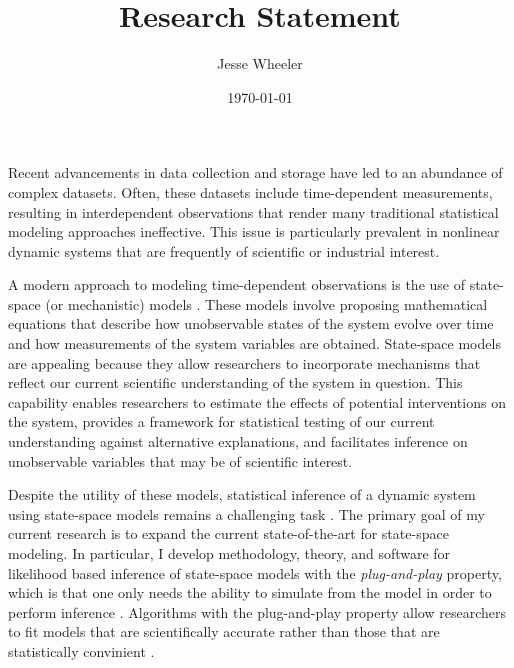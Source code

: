 \documentclass{article}
\title{Research Statement}
\author{Jesse Wheeler}
\date{\today}
\begin{document}
\rule{0mm}{1mm}
\vspace{-20mm}


\vspace{1mm}

\rule{0mm}{1mm}

\vspace{3mm}
\rule{0mm}{1mm}

\vspace{4mm}

\noindent Recent advancements in data collection and storage have led to an abundance of complex datasets.
Often, these datasets include time-dependent measurements, resulting in interdependent observations that render many traditional statistical modeling approaches ineffective.
This issue is particularly prevalent in nonlinear dynamic systems that are frequently of scientific or industrial interest.

A modern approach to modeling time-dependent observations is the use of state-space (or mechanistic) models \cite{durbin12}.
These models involve proposing mathematical equations that describe how unobservable states of the system evolve over time and how measurements of the system variables are obtained.
State-space models are appealing because they allow researchers to incorporate mechanisms that reflect our current scientific understanding of the system in question.
This capability enables researchers to estimate the effects of potential interventions on the system, provides a framework for statistical testing of our current understanding against alternative explanations, and facilitates inference on unobservable variables that may be of scientific interest.

Despite the utility of these models, statistical inference of a dynamic system using state-space models remains a challenging task \cite{auger16}.
The primary goal of my current research is to expand the current state-of-the-art for state-space modeling.
In particular, I develop methodology, theory, and software for likelihood based inference of state-space models with the {\it plug-and-play} property, which is that one only needs the ability to simulate from the model in order to perform inference \cite{breto09}.
Algorithms with the plug-and-play property allow researchers to fit models that are scientifically accurate rather than those that are statistically convinient \cite{wheeler24}.
\end{document}
